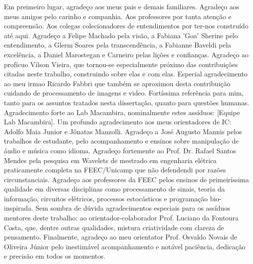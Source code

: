 Em preimeiro lugar, agradeço aos meus pais e demais familiares. Agradeço aos
meus amigos pelo carinho e companhia. Aos professores por tanta atenção e compreensão.
Aos colegas colecionadores de entendimentos por ter-nos construído até aqui.
Agradeço a Felipe Machado pela visão, a Fabiana 'Goa' Sherine pelo entendimento,
a Glerm Soares pela transcendência, a Fabianne Baveldi pela excelência, a Daniel
Marostegan e Carneiro pelas lições e confianças. Agradeço ao profícuo Vilson Vieira, que tornou-se especialmente próximo
das contribuições citadas neste trabalho, construindo sobre elas e com elas. Especial agradecimento
ao meu irmao Ricardo Fabbri que também se aproximou desta contribuição cuidando de processamento de imagens e video. Fortíssima referência
para mim, tanto para os assuntos tratados nesta dissertação, quanto para questões humanas. Agradecimento
forte ao Lab Macambira, nominalmente estes assíduos: [Equipe Lab Macambira]. Um profundo agradecimento
aos meus orientadores de IC: Adolfo Maia Junior e Jônatas Manzolli. Agradeço a José Augusto Mannis
pelos trabalhos de estudante, pelo acompanhamento e ensinos sobre manipulação de áudio e música como idioma.
Agradeço fortemente ao Prof. Dr. Rafael Santos Mendes pela pesquisa em Wavelets de mestrado em engenharia elétrica
praticamente completa na FEEC/Unicamp que não defendendi por razões circunstanciais. Agradeço aos professores da FEEC pelos ensinos de
primeiríssima qualidade em diversas disciplinas como processamento de sinais, teoria da informação, 
circuitos elétricos, processos estocásticos
e programação bio-inspirada. Sem sombra de dúvida agradecimentos especiais para os assíduos mentores
deste trabalho: ao orientador-colaborador Prof. Luciano da Fontoura Costa, que, dentre outras qualidades,
mistura criatividade com clareza de pensamento. Finalmente, agradeço ao meu 
orientator Prof. Osvaldo Novais de Oliveira Júnior pelo inestimável acompanhamento
e notável paciência, dedicação e precisão em todos os momentos.